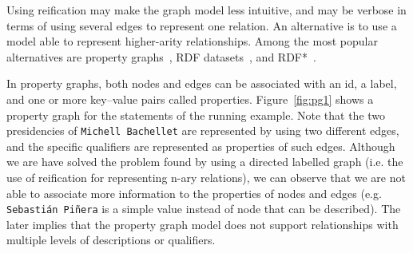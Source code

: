 
Using reification may make the graph model less intuitive, and may be verbose in terms of using several edges to represent one relation. An alternative is to use a model able to represent higher-arity relationships. Among the most popular alternatives are property graphs~\cite{FrancisGGLLMPRS18}, RDF datasets~\cite{CyganiakWL14}, and RDF*~\cite{Hartig17}. 

In property graphs, both nodes and edges can be associated with an id, a label, and one or more key--value pairs called properties. Figure~\ref{fig:pg1} shows a property graph for the statements of the running example.
Note that the two presidencies of \texttt{Michell Bachellet} are represented by using two different edges, and the specific qualifiers are represented as properties of such edges. 
Although we are have solved the problem found by using a directed labelled graph (i.e. the use of reification for representing n-ary relations), we can observe that we are not able to associate more information to the properties of nodes and edges (e.g. \texttt{Sebastián Piñera} is a simple value instead of node that can be described). The later implies that the property graph model does not support relationships with multiple levels of descriptions or qualifiers. 

